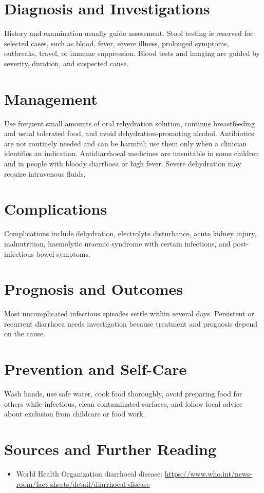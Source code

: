 \section*{Diagnosis and Investigations}
History and examination usually guide assessment. Stool testing is reserved for selected cases, such as blood, fever, severe illness, prolonged symptoms, outbreaks, travel, or immune suppression. Blood tests and imaging are guided by severity, duration, and suspected cause.
\section*{Management}
Use frequent small amounts of oral rehydration solution, continue breastfeeding and usual tolerated food, and avoid dehydration-promoting alcohol. Antibiotics are not routinely needed and can be harmful; use them only when a clinician identifies an indication. Antidiarrhoeal medicines are unsuitable in some children and in people with bloody diarrhoea or high fever. Severe dehydration may require intravenous fluids.
\section*{Complications}
Complications include dehydration, electrolyte disturbance, acute kidney injury, malnutrition, haemolytic uraemic syndrome with certain infections, and post-infectious bowel symptoms.
\section*{Prognosis and Outcomes}
Most uncomplicated infectious episodes settle within several days. Persistent or recurrent diarrhoea needs investigation because treatment and prognosis depend on the cause.
\section*{Prevention and Self-Care}
Wash hands, use safe water, cook food thoroughly, avoid preparing food for others while infectious, clean contaminated surfaces, and follow local advice about exclusion from childcare or food work.
\section*{Sources and Further Reading}
\begin{itemize}
    \item World Health Organization diarrhoeal disease: \url{https://www.who.int/news-room/fact-sheets/detail/diarrhoeal-disease}
\end{itemize}

